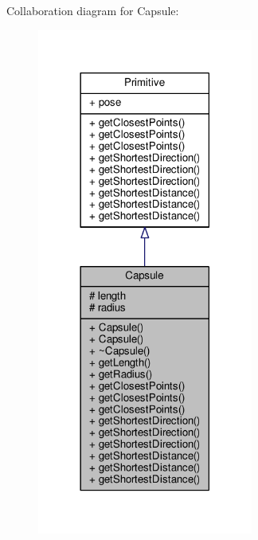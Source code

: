 Collaboration diagram for Capsule\+:
\nopagebreak
\begin{figure}[H]
\begin{center}
\leavevmode
\includegraphics[width=201pt]{class_capsule__coll__graph}
\end{center}
\end{figure}
